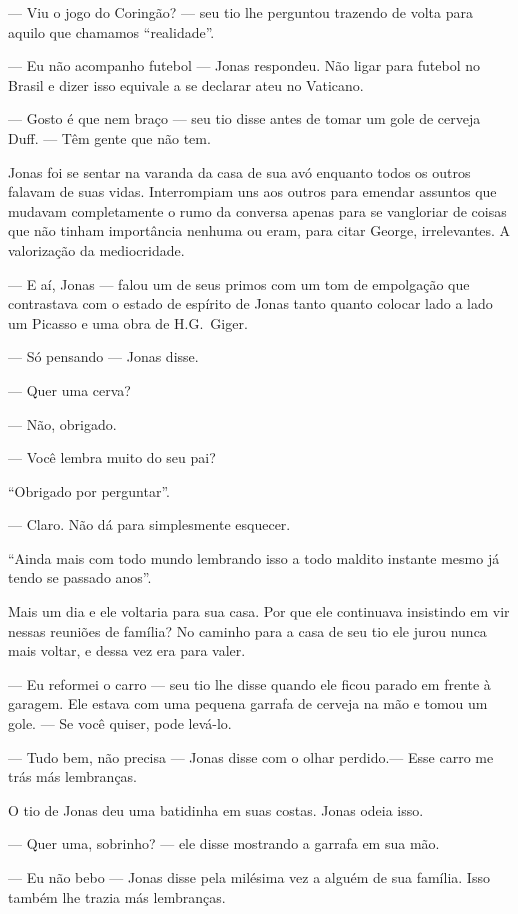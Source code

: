 --- Viu o jogo do Coringão? --- seu tio lhe perguntou\mudanca{,} trazendo de volta para aquilo que chamamos ``realidade''.

--- Eu não acompanho futebol --- Jonas respondeu. Não ligar para futebol no Brasil e dizer isso equivale a se declarar ateu no Vaticano.

--- Gosto é que nem braço --- seu tio disse\mudanca{,} antes de tomar um gole de cerveja Duff. --- Têm gente que não tem.

Jonas foi se sentar na varanda da casa de sua avó enquanto todos os outros falavam de suas vidas. Interrompiam uns aos outros para emendar assuntos que mudavam completamente o rumo da conversa apenas para se vangloriar de coisas que não tinham importância nenhuma ou eram, para citar George, irrelevantes. A valorização da mediocridade.

--- E aí, Jonas --- falou um de seus primos com um tom de empolgação que contrastava com o estado de espírito de Jonas tanto quanto colocar lado a lado um Picasso e uma obra de H.G.~Giger.

--- Só pensando --- Jonas disse.

--- Quer uma cerva?

--- Não, obrigado.

--- Você lembra muito do seu pai?

``Obrigado por perguntar''.

--- Claro. Não dá para simplesmente esquecer.

``Ainda mais com todo mundo  lembrando isso a todo maldito instante\mudanca{,} mesmo já tendo se passado anos''.

Mais um dia e ele voltaria para sua casa. Por que ele continuava insistindo em vir nessas reuniões de família? No caminho para a casa de seu tio ele jurou nunca mais voltar, e dessa vez era para valer.

--- Eu reformei o carro --- seu tio lhe disse quando ele ficou parado em frente à garagem. Ele estava com uma pequena garrafa de cerveja na mão e tomou um gole. --- Se você quiser, pode levá-lo.

--- Tudo bem, não precisa --- Jonas disse com o olhar perdido.--- Esse carro me trás más lembranças.

O tio de Jonas deu uma batidinha em suas costas. Jonas odeia isso.

--- Quer uma, sobrinho? --- ele disse mostrando a garrafa em sua mão.

--- Eu não bebo --- Jonas disse pela milésima vez a alguém de sua família. Isso também lhe trazia más lembranças.

